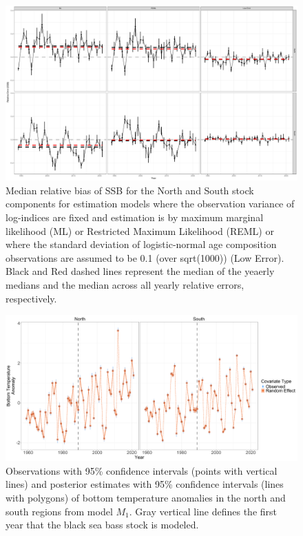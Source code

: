 \documentclass[
]{article}
\begin{document}
\begin{landscape}
 
\begin{figure}

{\centering \includegraphics[width=1\linewidth]{self_test_results} 

}

\caption{Median relative bias of SSB for the North and South stock components for estimation models where the observation variance of log-indices are fixed and estimation is by maximum marginal likelihood (ML) or Restricted Maximum Likelihood (REML) or where the standard deviation of logistic-normal age composition observations are assumed to be 0.1 (over sqrt(1000)) (Low Error). Black and Red dashed lines represent the median of the yeaerly medians and the median across all yearly relative errors, respectively.}\label{fig:self-test-fig}
\end{figure}

\begin{figure}

{\centering \includegraphics[width=1\linewidth]{BTA_full_fig} 

}

\caption{Observations with 95\% confidence intervals (points with vertical lines) and posterior estimates with 95\% confidence intervals (lines with polygons) of bottom temperature anomalies in the north and south regions from model $M_1$. Gray vertical line defines the first year that the black sea bass stock is modeled.}\label{fig:bottom-temperature}
\end{figure}

\end{landscape}
\pagebreak
\end{document}

